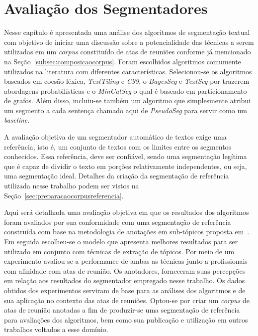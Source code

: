 \chapter{Avaliação dos Segmentadores}\label{cap-segmentadores}




Nesse capítulo é apresentada uma análise dos algoritmos de segmentação textual com objetivo de iniciar uma discussão sobre a potencialidade das técnicas a serem utilizadas em um \textit{corpus} constituído de atas de reuniões conforme já mencionado na Seção~\ref{subsec:composicaocorpus}. 
Foram escolhidos algoritmos comumente utilizados na literatura com diferentes características.  Selecionou-se os algoritmos baseados em coesão léxica, \textit{TextTiling} e \textit{C99}, o \textit{BayesSeg} e \textit{TextSeg} por trazerem abordagens probabilísticas e o \textit{MinCutSeg} o qual é baseado em particionamento de grafos.
% 
Além disso, incluiu-se também um algoritmo que simplesmente atribui um segmento a cada sentença chamado aqui de \textit{PseudoSeg} para servir como um \textit{baseline}.

A avaliação objetiva de um segmentador automático de textos exige uma referência, isto é, um conjunto de textos com os limites entre os segmentos conhecidos. Essa referência, deve ser confiável, sendo uma segmentação legítima que é capaz de dividir o texto em porções relativamente independentes, ou seja, uma segmentação ideal. Detalhes da criação da segmentação de referência utilizada nesse trabalho podem ser vistos na Seção~\ref{sec:preparacaocorpusreferencia}.

Aqui será detalhada uma avaliação objetiva em que os resultados dos algoritmos foram avaliados por sua conformidade com uma segmentação de referência construída com base na metodologia de anotações em sub-tópicos proposta em~\cite{Hovy2010}. 
Em seguida escolheu-se o modelo que apresenta melhores resultados para ser utilizado em conjunto com técnicas de extração de tópicos. Por meio de um experimento avaliou-se a performance de ambas as técnicas junto a profissionais com afinidade com atas de reunião. Os anotadores, forneceram suas percepções em relação aos resultados do segmentador empregado nesse trabalho.  
Os dados obtidos dos experimentos serviram de base para as análises dos algoritmos e de sua aplicação no contexto das atas de reuniões. 
Optou-se por criar um \textit{corpus} de atas de reunião anotadas a fim de produzir-se uma segmentação de referência para avaliações dos algoritmos, bem como sua publicação e utilização em outros trabalhos voltados a esse domínio. 

